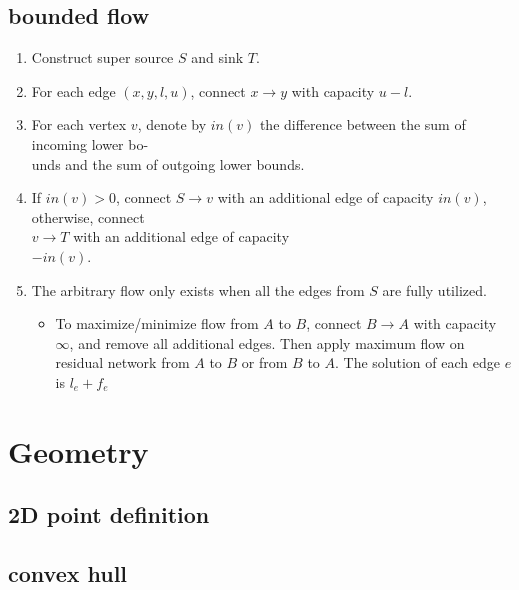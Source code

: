 \subsection{bounded flow}
\onehalfspacing
\begin{enumerate}
    \item Construct super source \mbox{\large\(S\)} and sink \mbox{\large\(T\)}.
    \item For each edge \mbox{\large\((x, y, l, u)\)}, connect \mbox{\large\(x \rightarrow y\)} with capacity \mbox{\large\(u - l\)}.
    \item For each vertex \mbox{\large\(v\)}, denote by \mbox{\large\(in(v)\)} the difference between the sum of incoming lower bo-\\unds and the sum of outgoing lower bounds.
    \item If \mbox{\large\(in(v) > 0\)}, connect \mbox{\large\(S \rightarrow v\)} with an additional edge of capacity \mbox{\large\(in(v)\)}, otherwise, connect\\ \mbox{\large\(v \rightarrow T\)} with an additional edge of capacity\\ \mbox{\large\(-in(v)\)}.
    \item The arbitrary flow only exists when all the edges from \mbox{\large\(S\)} are fully utilized.
    \begin{itemize}
        \item To maximize/minimize flow from \mbox{\large\(A\)} to \mbox{\large\(B\)}, connect \mbox{\large\(B \rightarrow A\)} with capacity \mbox{\large\(\infty\)}, and remove all additional edges. Then apply maximum flow on residual network from \mbox{\large\(A\)} to \mbox{\large\(B\)} or from \mbox{\large\(B\)} to \mbox{\large\(A\)}. The solution of each edge \mbox{\large\(e\)} is \mbox{\large\(l_e + f_e\)}
    \end{itemize}
\end{enumerate}
\singlespacing

\section{Geometry}
\subsection{2D point definition}

\subsection{convex hull}

